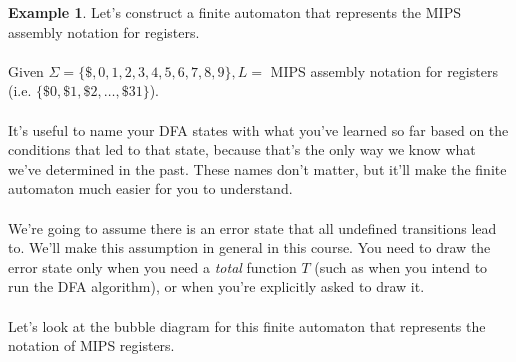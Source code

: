 \documentclass[]{article}
\theoremstyle{definition}
\newtheorem{ex}{Example}[section]
\begin{document}
				\begin{ex}
					Let's construct a finite automaton that represents the MIPS assembly notation for registers.
					\\ \\
					Given $\Sigma = \{ \$, 0, 1, 2, 3, 4, 5, 6, 7, 8, 9 \}, L = $ MIPS assembly notation for registers (i.e. $\{ \$0, \$1, \$2, \ldots, \$31 \}$).
					\\ \\
					It's useful to name your DFA states with what you've learned so far based on the conditions that led to that state, because that's the only way we know what we've determined in the past. These names don't matter, but it'll make the finite automaton much easier for you to understand.
					\\ \\
					We're going to assume there is an error state that all undefined transitions lead to. We'll make this assumption in general in this course. You need to draw the error state only when you need a \emph{total} function $T$ (such as when you intend to run the DFA algorithm), or when you're explicitly asked to draw it.
					\\ \\
					Let's look at the bubble diagram for this finite automaton that represents the notation of MIPS registers.
					\begin{center}
\end{center}
\end{ex}
\end{document}
